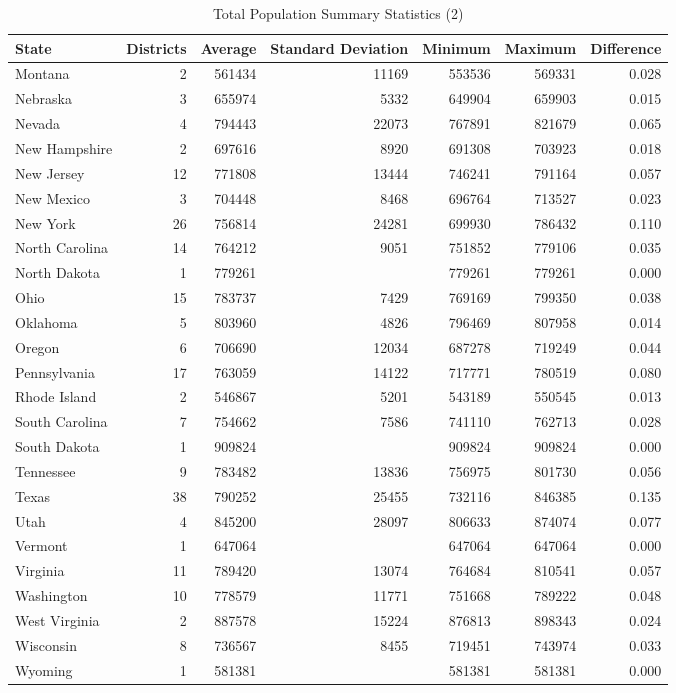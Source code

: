 \documentclass[12pt]{article}
\begin{document}
	\begin{table}[ht]
		\centering
		\caption{Total Population Summary Statistics (2)}
		\label{total_pop_stats2}
		\begin{adjustbox}{max width=\textwidth}
		\begin{tabular}{lrrrrrr}
		  \hline
		  State & Districts & Average  & Standard Deviation & Minimum & Maximum & Difference \\ 
	  \hline
		  Montana & 2 & 561434 & 11169 & 553536 & 569331 & 0.028 \\ 
	   Nebraska & 3 & 655974 & 5332 & 649904 & 659903 & 0.015 \\ 
	   Nevada & 4 & 794443 & 22073 & 767891 & 821679 & 0.065 \\ 
	   New Hampshire & 2 & 697616 & 8920 & 691308 & 703923 & 0.018 \\ 
	  New Jersey & 12 & 771808 & 13444 & 746241 & 791164 & 0.057 \\ 
	  New Mexico & 3 & 704448 & 8468 & 696764 & 713527 & 0.023 \\ 
	   New York & 26 & 756814 & 24281 & 699930 & 786432 & 0.110 \\ 
	  North Carolina & 14 & 764212 & 9051 & 751852 & 779106 & 0.035 \\ 
	 North Dakota & 1 & 779261 &  & 779261 & 779261 & 0.000 \\ 
	   Ohio & 15 & 783737 & 7429 & 769169 & 799350 & 0.038 \\ 
	   Oklahoma & 5 & 803960 & 4826 & 796469 & 807958 & 0.014 \\ 
	   Oregon & 6 & 706690 & 12034 & 687278 & 719249 & 0.044 \\ 
	  Pennsylvania & 17 & 763059 & 14122 & 717771 & 780519 & 0.080 \\ 
	  Rhode Island & 2 & 546867 & 5201 & 543189 & 550545 & 0.013 \\ 
	 South Carolina & 7 & 754662 & 7586 & 741110 & 762713 & 0.028 \\ 
	  South Dakota & 1 & 909824 &  & 909824 & 909824 & 0.000 \\ 
	   Tennessee & 9 & 783482 & 13836 & 756975 & 801730 & 0.056 \\ 
	   Texas & 38 & 790252 & 25455 & 732116 & 846385 & 0.135 \\ 
	  Utah & 4 & 845200 & 28097 & 806633 & 874074 & 0.077 \\ 
	   Vermont & 1 & 647064 &  & 647064 & 647064 & 0.000 \\ 
	   Virginia & 11 & 789420 & 13074 & 764684 & 810541 & 0.057 \\ 
	   Washington & 10 & 778579 & 11771 & 751668 & 789222 & 0.048 \\ 
	   West Virginia & 2 & 887578 & 15224 & 876813 & 898343 & 0.024 \\ 
	  Wisconsin & 8 & 736567 & 8455 & 719451 & 743974 & 0.033 \\ 
	   Wyoming & 1 & 581381 &  & 581381 & 581381 & 0.000 \\ 
		  \hline
		  
		\end{tabular}
	\end{adjustbox}
	\end{table}
\end{document}
